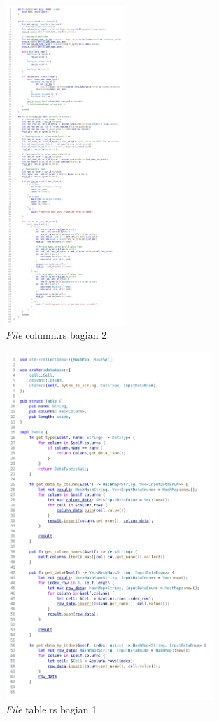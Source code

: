 \begin{figure}[H]
  \centering{}
	\includegraphics[width=0.4\textwidth]{gambar/lampiran/file-column-2.png}
  \caption{\emph{File} column.rs bagian 2}
\end{figure}

\begin{figure}[H]
  \centering{}
	\includegraphics[width=0.7\textwidth]{gambar/lampiran/file-table-1.png}
  \caption{\emph{File} table.rs bagian 1}
\end{figure}

